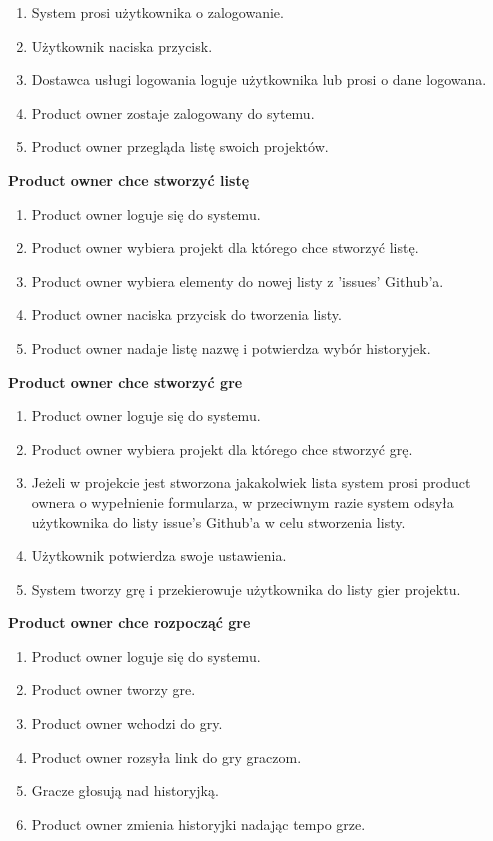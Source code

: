 \begin{enumerate}
    \item System prosi użytkownika o zalogowanie.
    \item Użytkownik naciska przycisk.
    \item Dostawca usługi logowania loguje użytkownika lub prosi o dane logowana.
    \item Product owner zostaje zalogowany do sytemu.
    \item Product owner przegląda listę swoich projektów.
\end{enumerate}

\textbf{Product owner chce stworzyć listę}

\begin{enumerate}
    \item Product owner loguje się do systemu.
    \item Product owner wybiera projekt dla którego chce stworzyć listę.
    \item Product owner wybiera elementy do nowej listy z 'issues' Github'a.
    \item Product owner naciska przycisk do tworzenia listy.
    \item Product owner nadaje listę nazwę i potwierdza wybór historyjek.
\end{enumerate}

\textbf{Product owner chce stworzyć gre}

\begin{enumerate}
    \item Product owner loguje się do systemu.
    \item Product owner wybiera projekt dla którego chce stworzyć grę.
    \item Jeżeli w projekcie jest stworzona jakakolwiek lista system prosi product ownera o wypełnienie formularza,
    w przeciwnym razie system odsyła użytkownika do listy issue's Github'a w celu stworzenia listy.
    \item Użytkownik potwierdza swoje ustawienia.
    \item System tworzy grę i przekierowuje użytkownika do listy gier projektu.
\end{enumerate}

\textbf{Product owner chce rozpocząć gre}

\begin{enumerate}
    \item Product owner loguje się do systemu.
    \item Product owner tworzy gre.
    \item Product owner wchodzi do gry.
    \item Product owner rozsyła link do gry graczom.
    \item Gracze głosują nad historyjką.
    \item Product owner zmienia historyjki nadając tempo grze.
\end{enumerate}

